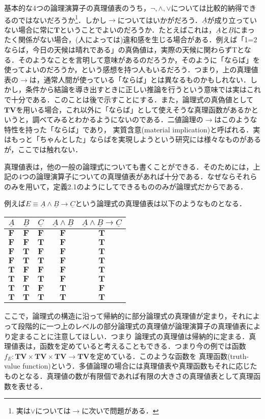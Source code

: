 \documentclass{ltjsarticle}
\theoremstyle{mystyle1}
\theoremstyle{mystyle3}
\theoremstyle{mystyle2}
\newcommand{\uA}{\underline{A}}
\newcommand{\uB}{\underline{B}}
\newcommand{\uC}{\underline{C}}
\newcommand{\bT}{\ensuremath{\mathbf{T}}}
\newcommand{\bF}{\ensuremath{\mathbf{F}}}
\newcommand{\bV}{\ensuremath{\mathbf{V}}}
\newcommand{\red}[1]{{\color{red} #1}}
\begin{document}
基本的な4つの論理演算子の真理値表のうち，$\neg,\wedge,\vee$については比較的納得できるのではないだろうか\footnote{実は$\vee$については$\to$に次いで問題がある．}．しかし$\to$についてはいかがだろう．$\uA$が成り立っていない場合に常に$\bT$ということでよいのだろうか．たとえばこれは，$\uA$と$\uB$にまったく関係がない場合，(人によっては)違和感を生じる場合がある．例えば「1=2ならば，今日の天候は晴れである」の真偽値は，実際の天候に関わらずTとなる．そのようなことを言明して意味があるのだろうか，そのように「ならば」を使ってよいのだろうか，という感想を持つ人もいるだろう．つまり，上の真理値表の$\to$は，通常人間が使っている「ならば」とは異なるものかもしれない．しかし，条件から結論を導き出すときに正しい推論を行うという意味では実はこれで十分である．このことは後で示すことにする．また，論理式の真偽値として$\bT\bV$を用いる場合，これ以外に「ならば」として使えそうな真理函数があるかというと，調べてみるとわかるようにないのである．二値論理の$\to$はこのような特性を持った「ならば」であり，\red{実質含意}(material implication)と呼ばれる．実はもっと「ちゃんとした」ならばを実現しようという研究には様々なものがあるが，ここでは触れない．

真理値表は，他の一般の論理式についても書くことができる．そのためには，上記の4つの論理演算子についての真理値表があれば十分である．なぜならそれらのみを用いて，定義2.1のようにしてできるもののみが論理式だからである．

例えば$E\equiv\uA\wedge\uB\to\uC$という論理式の真理値表は以下のようなものとなる．
\begin{table}[h]
  \centering
  \begin{tabular}{|c|c|c||c|c|}\hline
    $\uA$ & $\uB$ & $\uC$ & $\uA\wedge\uB$ & $\uA\wedge\uB\to\uC$ \\\hline\hline
    $\bF$ & $\bF$ & $\bF$ & $\bF$          & $\bT$                \\\hline
    $\bF$ & $\bF$ & $\bT$ & $\bF$          & $\bT$                \\\hline
    $\bF$ & $\bT$ & $\bF$ & $\bF$          & $\bT$                \\\hline
    $\bF$ & $\bT$ & $\bT$ & $\bF$          & $\bT$                \\\hline
    $\bT$ & $\bF$ & $\bF$ & $\bF$          & $\bT$                \\\hline
    $\bT$ & $\bF$ & $\bT$ & $\bF$          & $\bT$                \\\hline
    $\bT$ & $\bT$ & $\bF$ & $\bT$          & $\bF$                \\\hline
    $\bT$ & $\bT$ & $\bT$ & $\bT$          & $\bT$                \\\hline
  \end{tabular}
\end{table}
ここで，論理式の構造に沿って帰納的に部分論理式の真理値が定まり，それによって段階的に一つ上のレベルの部分論理式の真理値が論理演算子の真理値表により定まることに注意してほしい．つまり\red{論理式の真理値は帰納的に定まる}．真理値表は，函数を定めていると考えることもできる．つまり今の例では函数$f_E:\bT\bV\times\bT\bV\times\bT\bV\to\bT\bV$を定めている．このような函数を\red{真理函数}(truth-value function)という．多値論理の場合には真理値表や真理函数もそれに応じたものとなる．真理値の数が有限個であれば有限の大きさの真理値表として真理函数を表せる．
\end{document}
